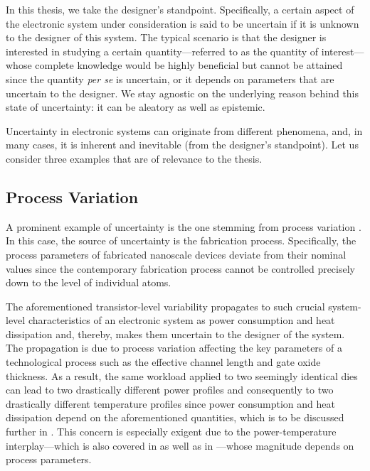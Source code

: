 In this thesis, we take the designer's standpoint. Specifically, a certain
aspect of the electronic system under consideration is said to be uncertain if
it is unknown to the designer of this system. The typical scenario is that the
designer is interested in studying a certain quantity---referred to as the
quantity of interest---whose complete knowledge would be highly beneficial but
cannot be attained since the quantity \emph{per se} is uncertain, or it depends
on parameters that are uncertain to the designer. We stay agnostic on the
underlying reason behind this state of uncertainty: it can be aleatory as well
as epistemic.

Uncertainty in electronic systems can originate from different phenomena, and,
in many cases, it is inherent and inevitable (from the designer's standpoint).
Let us consider three examples that are of relevance to the thesis.

\subsection{Process Variation}

A prominent example of uncertainty is the one stemming from process variation
\cite{chandrakasan2000, srivastava2010}. In this case, the source of uncertainty
is the fabrication process. Specifically, the process parameters of fabricated
nanoscale devices deviate from their nominal values since the contemporary
fabrication process cannot be controlled precisely down to the level of
individual atoms.

The aforementioned transistor-level variability propagates to such crucial
system-level characteristics of an electronic system as power consumption and
heat dissipation and, thereby, makes them uncertain to the designer of the
system. The propagation is due to process variation affecting the key parameters
of a technological process such as the effective channel length and gate oxide
thickness. As a result, the same workload applied to two seemingly identical
dies can lead to two drastically different power profiles and consequently to
two drastically different temperature profiles since power consumption and heat
dissipation depend on the aforementioned quantities, which is to be discussed
further in . This concern is especially exigent due to the
power-temperature interplay---which is also covered in  as
well as in ---whose magnitude depends on process
parameters.

